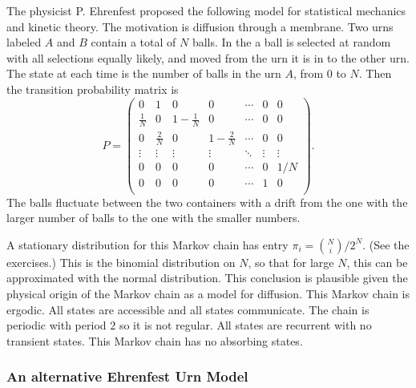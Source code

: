 \documentclass[12pt]{article}
\begin{document}
The physicist P. Ehrenfest proposed the following model for statistical
mechanics and kinetic theory.  The motivation is diffusion through a
membrane.  Two urns labeled \( A \) and \( B \) contain a total of \( N \)
balls.  In the  a%
ball is selected at random with all selections equally likely, and moved
from the urn it is in to the other urn.  The state at each time is the
number of balls in the urn \( A \), from \( 0 \) to \( N \).  Then the
transition probability matrix is
\[
    P =
    \begin{pmatrix}
        0 & 1 & 0 & 0 & \cdots & 0 & 0 \\
        \frac{1}{N} & 0 & 1-\frac{1}{N} & 0 & \cdots & 0 & 0 \\
        0 & \frac{2}{N} & 0 & 1-\frac{2}{N} & \cdots & 0 & 0 \\
        \vdots & \vdots & \vdots & \vdots & \ddots& \vdots & \vdots \\
        0 & 0 & 0 & 0 & \cdots & 0 & 1/N \\
        0 & 0 & 0 & 0 & \cdots & 1 & 0 \\
    \end{pmatrix}
    .
\] The balls fluctuate between the two containers with a drift from the
one with the larger number of balls to the one with the smaller numbers.

A stationary distribution for this Markov chain has entry \( \pi_i =
\binom{N}{i}/2^N \). (See the exercises.)  This is the binomial distribution on \( N \),
so that for large \( N \), this can be approximated with the normal
distribution.  This conclusion is plausible given the physical origin of
the Markov chain as a model for diffusion. This Markov chain is
ergodic.  All states are accessible and all states communicate.  The
chain is periodic with period \( 2 \) so it is not regular.  All states
are recurrent with no transient states.  This Markov chain has no
absorbing states.

\subsubsection*{An alternative Ehrenfest Urn Model}
\end{document}
